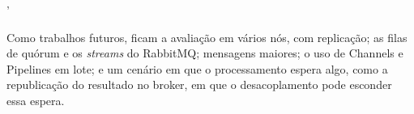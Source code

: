 '\documentclass[12pt]{article}
\begin{document}
Como trabalhos futuros, ficam a avaliação em vários nós, com replicação; as filas de
quórum e os \textit{streams} do RabbitMQ; mensagens maiores; o uso de Channels e
Pipelines em lote; e um cenário em que o processamento espera algo, como a republicação do
resultado no broker, em que o desacoplamento pode esconder essa espera.




\end{document}
